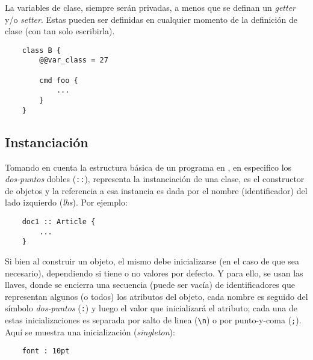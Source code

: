 \documentclass[12pt,letterpaper,titlepage,oneside,openright]{book}
\newcommand{\OhTeX}{%
    \makebox[0.76em][c]{O}%
    \makebox[0.25em][c]{%
        \raisebox{0.14em}[0em][0em]{%
            \fontsize{0.5em}{0cm}%
                \selectfont H%
        }%
    }%
    \makebox[1.35em][c]{\TeX}%
}
\newcommand{\ohtex}{\OhTeX\xspace}
\begin{document}
La variables de clase, siempre serán privadas, a menos que se definan un \textit{getter} y/o \textit{setter}. Estas pueden ser definidas en cualquier momento de la definición de clase (con tan solo escribirla).

\begin{center}
\begin{minipage}{\linewidth}
\begin{lstlisting}
    class B {
        @@var_class = 27

        cmd foo {
            ...
        }
    }
\end{lstlisting}
\end{minipage}
\end{center}

\subsection{Instanciación}

Tomando en cuenta la estructura básica de un programa en \ohtex, en especifico
los \textit{dos-puntos} dobles (\texttt{::}), representa la instanciación de
una clase, es el constructor de objetos y la referencia a esa instancia es dada
por el nombre (identificador) del lado izquierdo (\textit{lhs}). Por ejemplo:

\begin{center}
\begin{minipage}{\linewidth}
\begin{lstlisting}
    doc1 :: Article {
        ...
    }   
\end{lstlisting}
\end{minipage}
\end{center}

Si bien al construir un objeto, el mismo debe inicializarse (en el caso de que
sea necesario), dependiendo si tiene o no valores por defecto. Y para ello, se
usan las llaves, donde se encierra una secuencia (puede ser vacía) de
identificadores que representan algunos (o todos) los atributos del objeto, cada
nombre es seguido del símbolo \textit{dos-puntos} (\texttt{:}) y luego el valor
que inicializará el atributo; cada una de estas inicializaciones es separada por
salto de linea (\verb|\n|) o por punto-y-coma (\texttt{;}). Aquí se muestra una
inicialización (\textit{singleton}):

\begin{center}
\begin{minipage}{\linewidth}
\begin{lstlisting}
    font : 10pt
\end{lstlisting}
\end{minipage}
\end{center}
\end{document}
